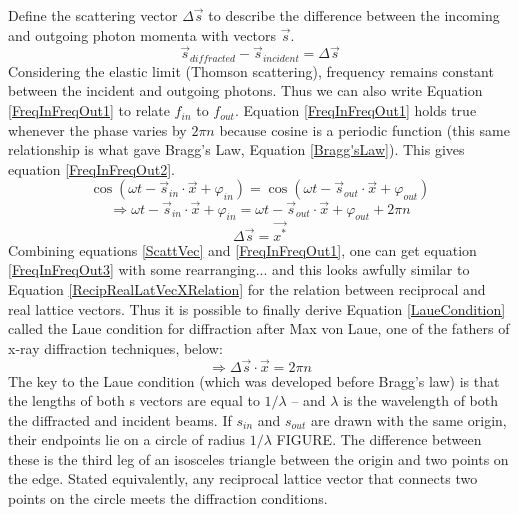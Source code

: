 Define the scattering vector $\Delta\vec{s}$ to describe the difference between the incoming and outgoing photon momenta with vectors $\vec{s}$.
\begin{equation}
    \vec{s}_{diffracted}-\vec{s}_{incident}=\Delta\vec{s}
    \label{ScattVec}
\end{equation}
Considering the elastic limit (Thomson scattering), frequency remains constant between the incident and outgoing photons. Thus we can also write Equation \ref{FreqInFreqOut1} to relate $f_{in}$ to $f_{out}$. Equation \ref{FreqInFreqOut1} holds true whenever the phase varies by $2\pi n$ because cosine is a periodic function (this same relationship is what gave Bragg’s Law, Equation \ref{Bragg'sLaw}). This gives equation \ref{FreqInFreqOut2}. 
\begin{equation}
   \cos{(\omega t-\vec{s}_{in}\cdot\vec{x}+\varphi_{in})}=\cos{(\omega t-\vec{s}_{out}\cdot\vec{x}+\varphi_{out})}
    \label{FreqInFreqOut1}
\end{equation}
\begin{equation}
    \Rightarrow\omega t-\vec{s}_{in}\cdot\vec{x}+\varphi_{in}=\omega t-\vec{s}_{out}\cdot\vec{x}+\varphi_{out}+2\pi n
    \label{FreqInFreqOut2}
\end{equation}
\begin{equation}
    \Delta\vec{s}=\vec{x^*}
    \label{FreqInFreqOut3}
\end{equation}
Combining equations \ref{ScattVec} and \ref{FreqInFreqOut1}, one can get equation \ref{FreqInFreqOut3} with some rearranging... and this looks awfully similar to Equation \ref{RecipRealLatVecXRelation} for the relation between reciprocal and real lattice vectors. Thus it is possible to finally derive Equation \ref{LaueCondition} called the Laue condition for diffraction after Max von Laue, one of the fathers of x-ray diffraction techniques, below: 
\begin{equation}
    \Rightarrow\Delta\vec{s}\cdot\vec{x}=2\pi n
    \label{LaueCondition}
\end{equation}
The key to the Laue condition (which was developed before Bragg’s law)  is that the lengths of both s vectors are equal to $1/\lambda$ – and $\lambda$ is the wavelength of both the diffracted and incident beams. If $s_{in}$ and $s_{out}$ are drawn with the same origin, their endpoints lie on a circle of radius $1/\lambda$ FIGURE. The difference between these is the third leg of an isosceles triangle between the origin and two points on the edge. Stated equivalently, any reciprocal lattice vector that connects two points on the circle meets the diffraction conditions.

